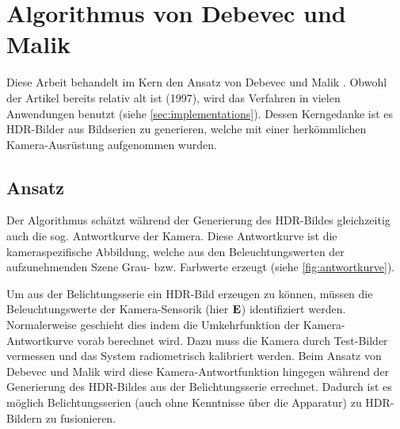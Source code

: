 \chapter{Algorithmus von Debevec und Malik}
\label{chap:algo}
Diese Arbeit behandelt im Kern den Ansatz von Debevec und Malik \cite{paper}. Obwohl der Artikel bereits relativ alt ist (1997), wird das Verfahren in vielen Anwendungen benutzt (siehe \autoref{sec:implementations}). Dessen Kerngedanke ist es \gls{HDR}-Bilder aus Bildserien zu generieren, welche mit einer herkömmlichen Kamera-Ausrüstung aufgenommen wurden.

\section{Ansatz}
Der Algorithmus schätzt während der Generierung des \gls{HDR}-Bildes gleichzeitig auch die sog. Antwortkurve der Kamera. Diese Antwortkurve ist die kameraspezifische Abbildung, welche aus den Beleuchtungswerten der aufzunehmenden Szene Grau- bzw. Farbwerte erzeugt (siehe \autoref{fig:antwortkurve}). 

Um aus der Belichtungsserie ein \gls{HDR}-Bild erzeugen zu können, müssen die Beleuchtungswerte der Kamera-Sensorik (hier $\mathbf E$) identifiziert werden. Normalerweise geschieht dies indem die Umkehrfunktion der Kamera-Antwortkurve vorab berechnet wird. Dazu muss die Kamera durch Test-Bilder vermessen und das System radiometrisch kalibriert werden. Beim Ansatz von Debevec und Malik wird diese Kamera-Antwortfunktion hingegen während der Generierung des \gls{HDR}-Bildes aus der Belichtungsserie errechnet. Dadurch ist es möglich Belichtungsserien (auch ohne Kenntnisse über die Apparatur) zu \gls{HDR}-Bildern zu fusionieren.



